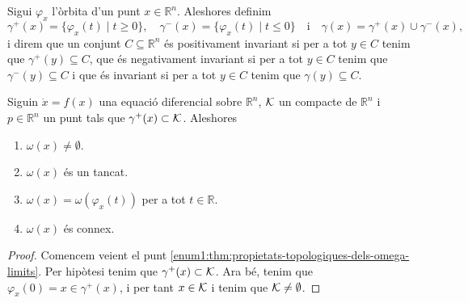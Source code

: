 \documentclass[../../main.tex]{subfiles}
\begin{document}
    \begin{definition}
        \label{def:conjunt-positivament-invariant}
        \label{def:conjunt-negativament-invariant}
        \label{def:conjunt-invariant}
        Sigui \(\varphi_{x}\) l'òrbita d'un punt \(x\in\mathbb{R}^{n}\).
        Aleshores definim
        \[
            \gamma^{+}(x)=\{\varphi_{x}(t)\mid t\geq0\},\quad\gamma^{-}(x)=\{\varphi_{x}(t)\mid t\leq0\}\quad\text{i}\quad\gamma(x)=\gamma^{+}(x)\cup\gamma^{-}(x),
        \]
        i direm que un conjunt \(C\subseteq\mathbb{R}^{n}\) és positivament invariant si per a tot \(y\in C\) tenim que \(\gamma^{+}(y)\subseteq C\), que és negativament invariant si per a tot \(y\in C\) tenim que \(\gamma^{-}(y)\subseteq C\) i que és invariant si per a tot \(y\in C\) tenim que \(\gamma(y)\subseteq C\).
    \end{definition}
    \begin{theorem}
        \label{thm:propietats-topologiques-dels-omega-limits}
        Siguin
        \(\dot{x}=f(x)\)
        una equació diferencial sobre \(\mathbb{R}^{n}\), \(\mathcal{K}\) un compacte de \(\mathbb{R}^{n}\) i \(p\in\mathbb{R}^{n}\) un punt tals que \(\gamma^{+}(x)\subset\mathcal{K}\).
        Aleshores
        \begin{enumerate}
            \item\label{enum1:thm:propietats-topologiques-dels-omega-limits} \(\omega(x)\neq\emptyset\).
            \item\label{enum2:thm:propietats-topologiques-dels-omega-limits} \(\omega(x)\) és un tancat.
            \item\label{enum3:thm:propietats-topologiques-dels-omega-limits} \(\omega(x)=\omega(\varphi_{x}(t))\) per a tot \(t\in\mathbb{R}\).
            \item\label{enum4:thm:propietats-topologiques-dels-omega-limits} \(\omega(x)\) és connex.
        \end{enumerate}
    \end{theorem}
    \begin{proof}
        Comencem veient el punt \eqref{enum1:thm:propietats-topologiques-dels-omega-limits}.
        Per hipòtesi tenim que \(\gamma^{+}(x)\subset\mathcal{K}\).
        Ara bé, tenim que \(\varphi_{x}(0)=x\in\gamma^{+}(x)\), i per tant \(x\in\mathcal{K}\) i tenim que \(\mathcal{K}\neq\emptyset\).
    \end{proof}
\end{document}
